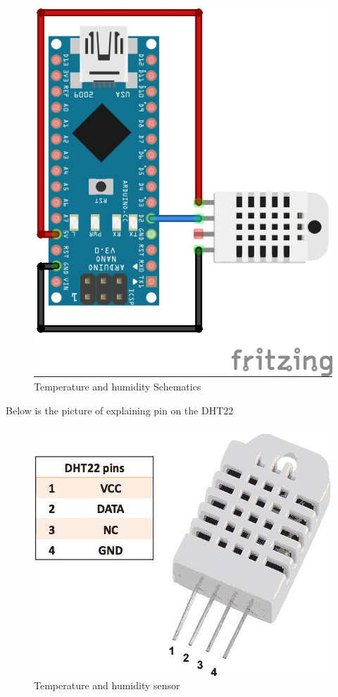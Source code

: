\documentclass{report}
\begin{document}
\begin{figure}[H]
\begin{center}
\includegraphics[scale=1.25]{images/H&T.jpg}
\caption{Temperature and humidity Schematics}	
\end{center}
\end{figure}
\newpage
Below is the picture of explaining pin on the DHT22 \\

\begin{figure}[H]
\begin{center}
\includegraphics[scale=0.25]{images/DHT22.jpg}
\caption{Temperature and humidity sensor}
\end{center}
\end{figure}
\end{document}
